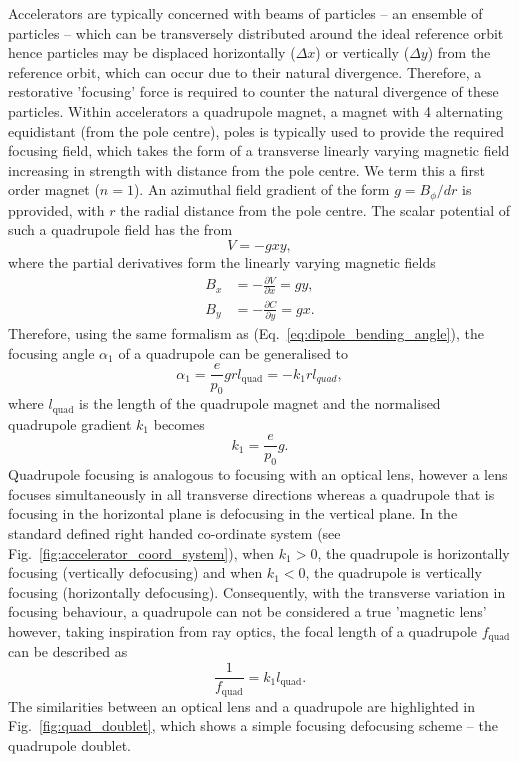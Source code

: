 \documentclass[../main.tex]{subfiles}
\begin{document}
Accelerators are typically concerned with beams of particles -- an ensemble of particles -- which can be transversely distributed around the ideal reference orbit hence particles may be  displaced horizontally ($\Delta x$) or vertically ($\Delta y$) from the reference orbit, which can occur due to their natural divergence. Therefore, a restorative 'focusing' force is required to counter the natural divergence of these particles. Within accelerators a quadrupole magnet, a magnet with 4 alternating equidistant (from the pole centre), poles is typically used to provide the required focusing field, which takes the form of a transverse linearly varying magnetic field increasing in strength with distance from the pole centre. We term this a first order magnet ($n=1$). An azimuthal field gradient of the form $g = B_{\phi}/dr$ is pprovided, with $r$ the radial distance from the pole centre. The scalar potential of such a quadrupole field has the from
\begin{equation}
V = -gxy,
\label{eq:quadrupole_potential}    
\end{equation}
where the partial derivatives form the linearly varying magnetic fields
\begin{align}
B_{x} &= -\frac{\partial V}{\partial x} = gy, \nonumber\\
B_{y} &= -\frac{\partial C}{\partial y} = gx.
\end{align}
Therefore, using the same formalism as (Eq.~\ref{eq:dipole_bending_angle}), the focusing angle $\alpha_{1}$ of a quadrupole can be generalised to
\begin{equation}
\alpha_{1} = \frac{e}{p_{0}}grl_{\mathrm{quad}} = -k_{1}rl_{quad},
\label{eq:quadrupole_focusing_angle}    
\end{equation}
where $l_{\mathrm{quad}}$ is the length of the quadrupole magnet and the normalised quadrupole gradient $k_{1}$ becomes
\begin{equation}
k_{1} = \frac{e}{p_{0}}g.
\label{eq:quadrupole_normalised_gradient}
\end{equation}
Quadrupole focusing is analogous to focusing with an optical lens, however a lens focuses simultaneously in all transverse directions whereas a quadrupole that is focusing in the horizontal plane is defocusing in the vertical plane. In the standard defined right handed co-ordinate system (see Fig.~\ref{fig:accelerator_coord_system}), when $k_{1} > 0$, the quadrupole is horizontally focusing (vertically defocusing) and when $k_{1} < 0$, the quadrupole is vertically focusing (horizontally defocusing). Consequently, with the transverse variation in focusing behaviour, a quadrupole can not be considered a true 'magnetic lens' however, taking inspiration from ray optics, the focal length of a quadrupole $f_{\mathrm{quad}}$ can be described as
\begin{equation}
\frac{1}{f_{\mathrm{quad}}} = k_{1}l_{\mathrm{quad}}.
\label{eq:focal_length_quadrupole}    
\end{equation}
The similarities between an optical lens and a quadrupole are highlighted in Fig.~\ref{fig:quad_doublet}, which shows a simple focusing defocusing scheme -- the quadrupole doublet. 
\end{document}
